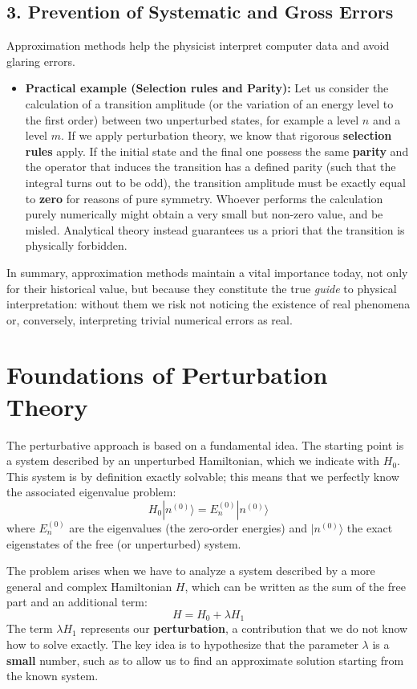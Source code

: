 \subsection{3. Prevention of Systematic and Gross Errors}
Approximation methods help the physicist interpret computer data and avoid glaring errors.
\begin{itemize}
\item \textbf{Practical example (Selection rules and Parity):} Let us consider the calculation of a transition amplitude (or the variation of an energy level to the first order) between two unperturbed states, for example a level $n$ and a level $m$. If we apply perturbation theory, we know that rigorous \textbf{selection rules} apply. If the initial state and the final one possess the same \textbf{parity} and the operator that induces the transition has a defined parity (such that the integral turns out to be odd), the transition amplitude must be exactly equal to \textbf{zero} for reasons of pure symmetry. Whoever performs the calculation purely numerically might obtain a very small but non-zero value, and be misled. Analytical theory instead guarantees us a priori that the transition is physically forbidden.
\end{itemize}
In summary, approximation methods maintain a vital importance today, not only for their historical value, but because they constitute the true \textit{guide} to physical interpretation: without them we risk not noticing the existence of real phenomena or, conversely, interpreting trivial numerical errors as real.

\section{Foundations of Perturbation Theory}

The perturbative approach is based on a fundamental idea. The starting point is a system described by an unperturbed Hamiltonian, which we indicate with $H_0$. This system is by definition exactly solvable; this means that we perfectly know the associated eigenvalue problem:
\begin{equation}
H_0 |n^{(0)}\rangle = E_n^{(0)} |n^{(0)}\rangle
\end{equation}
where $E_n^{(0)}$ are the eigenvalues (the zero-order energies) and $\vert{}n^{(0)}\rangle$ the exact eigenstates of the free (or unperturbed) system.

The problem arises when we have to analyze a system described by a more general and complex Hamiltonian $H$, which can be written as the sum of the free part and an additional term:
\begin{equation}
H = H_0 + \lambda H_1
\end{equation}
The term $\lambda H_1$ represents our \textbf{perturbation}, a contribution that we do not know how to solve exactly. The key idea is to hypothesize that the parameter $\lambda$ is a \textbf{small} number, such as to allow us to find an approximate solution starting from the known system.

